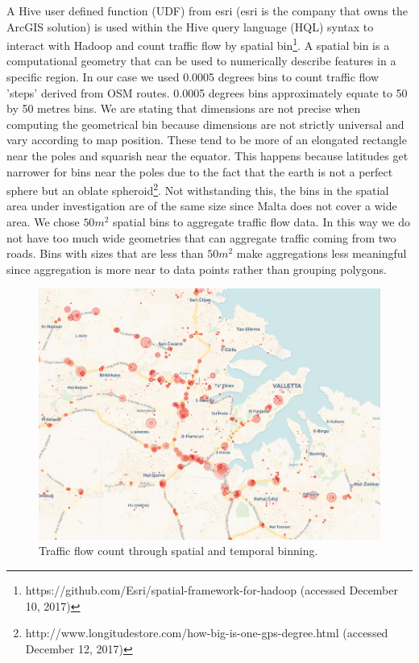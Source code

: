 \documentclass[12pt, a4paper]{report}
\theoremstyle{definition}
\theoremstyle{definition}%
\theoremstyle{definition}%
\theoremstyle{definition}%
\theoremstyle{definition}%
\theoremstyle{definition}%
\begin{document}
A Hive user defined function (UDF) from esri (esri is the company that owns the ArcGIS solution) is used within the Hive query language (HQL) syntax to interact with Hadoop and count traffic flow by spatial bin\footnote{https://github.com/Esri/spatial-framework-for-hadoop (accessed December 10, 2017)}. A spatial bin is a computational geometry that can be used to numerically describe features in a specific region. In our case we used 0.0005 degrees bins to count traffic flow 'steps' derived from OSM routes. 0.0005 degrees bins approximately equate to 50 by 50 metres bins. We are stating that dimensions are not precise when computing the geometrical bin because dimensions are not strictly universal and vary according to map position. These tend to be more of an elongated rectangle near the poles and squarish near the equator. This happens because latitudes get narrower for bins near the poles due to the fact that the earth is not a perfect sphere but an oblate spheroid\footnote{http://www.longitudestore.com/how-big-is-one-gps-degree.html (accessed December 12, 2017)}. Not withstanding this, the bins in the spatial area under investigation are of the same size since Malta does not cover a wide area. We chose $50m^2$ spatial bins to aggregate traffic flow data. In this way we do not have too much wide geometries that can aggregate traffic coming from two roads. Bins with sizes that are less than $50m^2$ make aggregations less meaningful since aggregation is more near to data points rather than grouping polygons. 

\begin{figure}[!]	
	\includegraphics[scale=0.6]{concentric_map.jpg}
	\centering
	\caption{Traffic flow count through spatial and temporal binning. }
	\label{fig:spatial_binning_traffic_count}
\end{figure}
\end{document}
